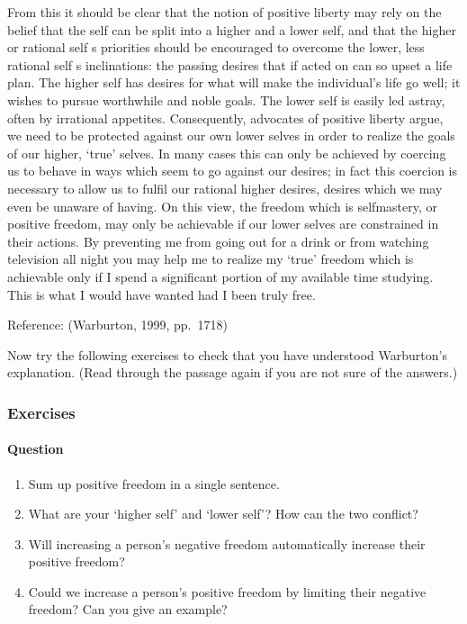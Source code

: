 \documentclass[letterpaper,10pt,english]{sphinxmanual}
\begin{document}
From this it should be clear that the notion of positive liberty may rely on the belief that the self can be split into a higher and a lower self, and that the higher or rational self s priorities should be encouraged to overcome the lower, less rational self s inclinations: the passing desires that if acted on can so upset a life plan. The higher self has desires for what will make the individual’s life go well; it wishes to pursue worthwhile and noble goals. The lower self is easily led
astray, often by irrational appetites. Consequently, advocates of positive liberty argue, we need to be protected against our own lower selves in order to realize the goals of our higher, ‘true’ selves. In many cases this can only be achieved by coercing us to behave in ways which seem to go against our desires; in fact this coercion is necessary to allow us to fulfil our rational higher desires, desires which we may even be unaware of having. On this view, the freedom which is self\sphinxhyphen{}mastery, or
positive freedom, may only be achievable if our lower selves are constrained in their actions. By preventing me from going out for a drink or from watching television all night you may help me to realize my ‘true’ freedom which is achievable only if I spend a significant portion of my available time studying. This is what I would have wanted had I been truly free.

Reference: (Warburton, 1999, pp. 17\textendash{}18)

Now try the following exercises to check that you have understood Warburton’s explanation. (Read through the passage again if you are not sure of the answers.)


\subsubsection{Exercises}
\label{\detokenize{content/session_00/Part_00_02:id1}}

\paragraph{Question}
\label{\detokenize{content/session_00/Part_00_02:id2}}\begin{enumerate}
%
\item {} 
Sum up positive freedom in a single sentence.

\item {} 
What are your ‘higher self’ and ‘lower self’? How can the two conflict?

\item {} 
Will increasing a person’s negative freedom automatically increase their positive freedom?

\item {} 
Could we increase a person’s positive freedom by limiting their negative freedom? Can you give an example?

\end{enumerate}
\end{document}
